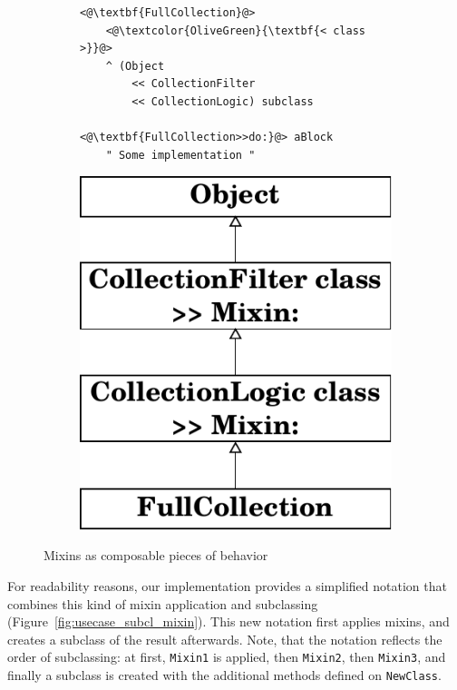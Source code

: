 \begin{figure}[!htp]
\centering
\begin{subfigure}[b]{0.6\textwidth}
\begin{lstlisting}
<@\textbf{FullCollection}@>
    <@\textcolor{OliveGreen}{\textbf{< class >}}@>
    ^ (Object 
        << CollectionFilter 
        << CollectionLogic) subclass

<@\textbf{FullCollection>>do:}@> aBlock
    " Some implementation "
\end{lstlisting}
\end{subfigure}
\qquad
\begin{subfigure}[b]{0.25\textwidth}
    \includegraphics[width=\textwidth]{usecase_classgen_v2.pdf}
\end{subfigure}
\caption{Mixins as composable pieces of behavior}
\label{fig:mixin_composable}
\end{figure}

For readability reasons, our implementation provides a simplified notation that combines this kind of mixin application and subclassing (Figure~\ref{fig:usecase_subcl_mixin}). This new notation first applies mixins, and creates a subclass of the result afterwards. Note, that the notation reflects the order of subclassing: at first, \texttt{Mixin1} is applied, then \texttt{Mixin2}, then \texttt{Mixin3}, and finally a subclass is created with the additional methods defined on \texttt{NewClass}.

